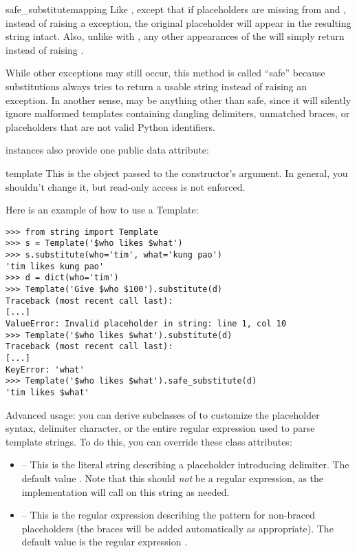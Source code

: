 \begin{methoddesc}[Template]{safe_substitute}{mapping}
Like , except that if placeholders are missing from
 and , instead of raising a 
exception, the original placeholder will appear in the resulting string
intact.  Also, unlike with , any other appearances of the
\samp{\$} will simply return \samp{\$} instead of raising
.

While other exceptions may still occur, this method is called ``safe'' because
substitutions always tries to return a usable string instead of raising an
exception.  In another sense,  may be anything other
than safe, since it will silently ignore malformed templates containing
dangling delimiters, unmatched braces, or placeholders that are not valid
Python identifiers.
\end{methoddesc}

 instances also provide one public data attribute:

\begin{memberdesc}[string]{template}
This is the object passed to the constructor's  argument.  In
general, you shouldn't change it, but read-only access is not enforced.
\end{memberdesc}

Here is an example of how to use a Template:

\begin{verbatim}
>>> from string import Template
>>> s = Template('$who likes $what')
>>> s.substitute(who='tim', what='kung pao')
'tim likes kung pao'
>>> d = dict(who='tim')
>>> Template('Give $who $100').substitute(d)
Traceback (most recent call last):
[...]
ValueError: Invalid placeholder in string: line 1, col 10
>>> Template('$who likes $what').substitute(d)
Traceback (most recent call last):
[...]
KeyError: 'what'
>>> Template('$who likes $what').safe_substitute(d)
'tim likes $what'
\end{verbatim}

Advanced usage: you can derive subclasses of  to customize the
placeholder syntax, delimiter character, or the entire regular expression used
to parse template strings.  To do this, you can override these class
attributes:

\begin{itemize}
\item {} -- This is the literal string describing a placeholder
      introducing delimiter.  The default value \samp{\$}.  Note that this
      should \emph{not} be a regular expression, as the implementation will
      call  on this string as needed.
\item {} -- This is the regular expression describing the pattern
      for non-braced placeholders (the braces will be added automatically as
      appropriate).  The default value is the regular expression
      \samp{[_a-z][_a-z0-9]*}.
\end{itemize}

